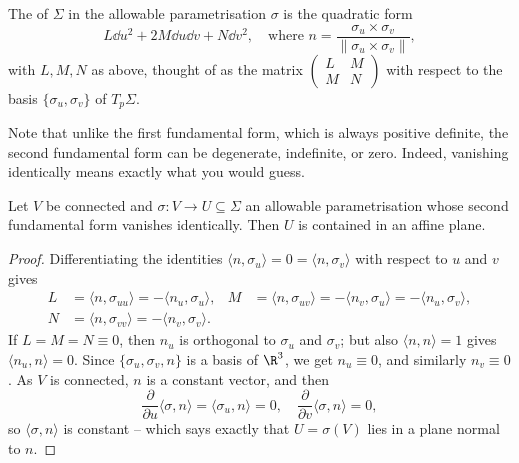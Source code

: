 \begin{definition}
    The  of $\Sigma$ in the allowable parametrisation $\sigma$ is the quadratic form
    $$
    L \dd u^2 + 2M \dd u \dd v + N \dd v^2, \quad \text{where } n = \frac{\sigma_u \times \sigma_v}{\|\sigma_u \times \sigma_v\|},
    $$
    with $L, M, N$ as above, thought of as the matrix $\begin{pmatrix} L & M \\ M & N \end{pmatrix}$ with respect to the basis $\{\sigma_u, \sigma_v\}$ of $T_p \Sigma$.
\end{definition}

Note that unlike the first fundamental form, which is always positive definite, the second fundamental form can be degenerate, indefinite, or zero. Indeed, vanishing identically means exactly what you would guess.

\begin{lemma}
    Let $V$ be connected and $\sigma : V \rightarrow U \subseteq \Sigma$ an allowable parametrisation whose second fundamental form vanishes identically. Then $U$ is contained in an affine plane.
\end{lemma}
\begin{proof}
    Differentiating the identities $\langle n, \sigma_u \rangle = 0 = \langle n, \sigma_v \rangle$ with respect to $u$ and $v$ gives
    \begin{align*}
        L &= \langle n, \sigma_{uu} \rangle = -\langle n_u, \sigma_u \rangle, &
        M &= \langle n, \sigma_{uv} \rangle = -\langle n_v, \sigma_u\rangle = -\langle n_u, \sigma_v \rangle, \\
        N &= \langle n, \sigma_{vv} \rangle = -\langle n_v, \sigma_v \rangle. & &
    \end{align*}
    If $L = M = N \equiv 0$, then $n_u$ is orthogonal to $\sigma_u$ and $\sigma_v$; but also $\langle n, n \rangle = 1$ gives $\langle n_u, n \rangle = 0$. Since $\{\sigma_u, \sigma_v, n\}$ is a basis of $\R^3$, we get $n_u \equiv 0$, and similarly $n_v \equiv 0$. As $V$ is connected, $n$ is a constant vector, and then
    $$
    \frac{\partial}{\partial u}\langle \sigma, n \rangle = \langle \sigma_u, n \rangle = 0, \quad \frac{\partial}{\partial v}\langle \sigma, n \rangle = 0,
    $$
    so $\langle \sigma, n \rangle$ is constant -- which says exactly that $U = \sigma(V)$ lies in a plane normal to $n$.
\end{proof}

